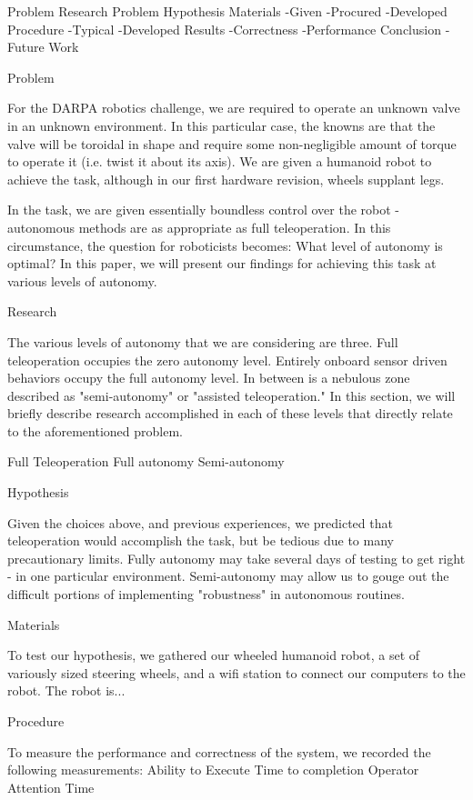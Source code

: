 Problem
Research
Problem
Hypothesis
Materials
-Given
-Procured
-Developed
Procedure
-Typical
-Developed
Results
-Correctness
-Performance
Conclusion
-Future Work

Problem

For the DARPA robotics challenge, we are required to operate an unknown valve in an unknown environment.  In this particular case, the knowns are that the valve will be toroidal in shape and require some non-negligible amount of torque to operate it (i.e. twist it about its axis).  We are given a humanoid robot to achieve the task, although in our first hardware revision, wheels supplant legs.

In the task, we are given essentially boundless control over the robot - autonomous methods are as appropriate as full teleoperation.  In this circumstance, the question for roboticists becomes: What level of autonomy is optimal?  In this paper, we will present our findings for achieving this task at various levels of autonomy.

Research

The various levels of autonomy that we are considering are three. Full teleoperation occupies the zero autonomy level.  Entirely onboard sensor driven behaviors occupy the full autonomy level. In between is a nebulous zone described as "semi-autonomy" or "assisted teleoperation."  In this section, we will briefly describe research accomplished in each of these levels that directly relate to the aforementioned problem.

Full Teleoperation
Full autonomy
Semi-autonomy

Hypothesis

Given the choices above, and previous experiences, we predicted that teleoperation would accomplish the task, but be tedious due to many precautionary limits.  Fully autonomy may take several days of testing to get right - in one particular environment.  Semi-autonomy may allow us to gouge out the difficult portions of implementing "robustness" in autonomous routines.

Materials

To test our hypothesis, we gathered our wheeled humanoid robot, a set of variously sized steering wheels, and a wifi station to connect our computers to the robot.  The robot is...

Procedure

To measure the performance and correctness of the system, we recorded the following measurements:
Ability to Execute
Time to completion
Operator Attention Time

